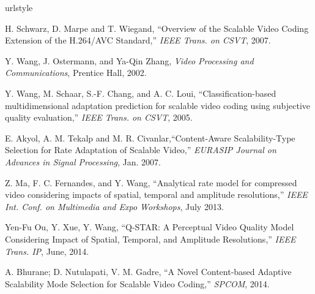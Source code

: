 \documentclass{beamer}
\begin{document}
%
%
\begin{thebibliography}{99}
\providecommand{\url}[1]{{#1}}
\providecommand{\urlprefix}{URL }
\expandafter\ifx\csname urlstyle\endcsname\relax
  \providecommand{\doi}[1]{DOI~\discretionary{}{}{}#1}\else
  \providecommand{\doi}{DOI~\discretionary{}{}{}\begingroup
  \urlstyle{rm}\Url}\fi

H. Schwarz, D. Marpe and T. Wiegand, ``Overview of the Scalable Video Coding Extension of the H.264/AVC Standard,'' \emph{IEEE Trans. on CSVT}, 2007.

Y. Wang, J. Ostermann, and Ya-Qin Zhang, \emph{Video Processing and Communications}, Prentice Hall, 2002.

Y. Wang, M. Schaar, S.-F. Chang, and A. C. Loui, ``Classification-based multidimensional adaptation prediction for scalable video coding using subjective quality evaluation,'' \emph{IEEE Trans. on CSVT}, 2005.

E. Akyol, A. M. Tekalp and M. R. Civanlar,``Content-Aware Scalability-Type Selection for Rate Adaptation of Scalable Video,'' \emph{EURASIP Journal on Advances in Signal Processing}, Jan. 2007.

Z. Ma, F. C. Fernandes, and Y. Wang, ``Analytical rate model for compressed video considering impacts of spatial, temporal and amplitude resolutions,'' \emph{IEEE Int. Conf. on Multimedia and Expo Workshops}, July 2013.

Yen-Fu Ou, Y. Xue, Y. Wang, ``Q-STAR: A Perceptual Video Quality Model Considering Impact of Spatial, Temporal, and Amplitude Resolutions,'' \emph{IEEE Trans. IP}, June, 2014.

A. Bhurane; D. Nutulapati, V. M. Gadre, ``A Novel Content-based Adaptive Scalability Mode Selection for Scalable Video Coding,'' \emph{SPCOM}, 2014.


\end{thebibliography}
\end{document}
